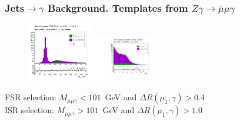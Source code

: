 \begin{frame}\frametitle{Jets$\rightarrow \gamma$ Background. Templates from $Z\gamma\rightarrow{\bar{\mu}}\mu\gamma$}
  \begin{figure}[htb]
    \begin{center}
       \includegraphics[width=0.25\textwidth]{../figs/figs_v11/MUON_ZGamma/PrepareYields/c_TotalDATAvsMC_Barrel__MpholeplepVERY_PRELIMINARY_pt15to500_.png}\includegraphics[width=0.25\textwidth]{../figs/figs_v11/MUON_ZGamma/PrepareYields/c_TotalDATAvsMC_Barrel__lep1PhoDeltaRVERY_PRELIMINARY_pt15to500_.pdf}\\
    \end{center}
  \end{figure}
\scriptize
FSR selection: $M_{\mu\mu\gamma}<101$~GeV and $\Delta R(\mu_{1},\gamma)>0.4$\\
ISR selection: $M_{\mu\mu\gamma}>101$~GeV and $\Delta R(\mu_{1},\gamma)>1.0$
\end{frame}%

